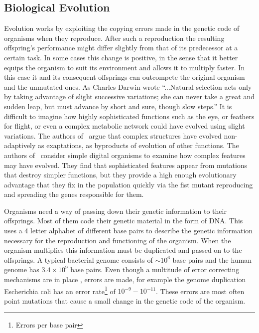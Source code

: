 \documentclass[a4paper,12pt]{article}
\begin{document}
	
	\subsection{Biological Evolution}\label{chap:evolution}
	
	Evolution works by exploiting the copying errors made in the genetic code of organisms when they reproduce. After such a reproduction the resulting offspring's performance might differ slightly from that of its predecessor at a certain task. In some cases this change is positive, in the sense that it better equips the organism to suit its environment and allows it to multiply faster. In this case it and its consequent offsprings can outcompete the original organism and the unmutated ones. As Charles Darwin wrote ``...Natural selection acts only by taking advantage of slight successive variations; she can never take a great and sudden leap, but must advance by short and sure, though slow steps.'' \cite{darwin} 
	It is difficult to imagine how highly sophisticated functions such as the eye, or feathers for flight, or even a complex metabolic network could have evolved using slight variations. The authors of~\cite{latent} argue that complex structures have evolved non-adaptively as exaptations, as byproducts of evolution of other functions. The authors of~\cite{complexfeatures} consider simple digital organisms to examine how complex features may have evolved. They find that sophisticated features appear from mutations that destroy simpler functions, but they provide a high enough evolutionary advantage that they fix in the population quickly via the fist mutant reproducing and spreading the genes responsible for them. 
	

	Organisms need a way of passing down their genetic information to their offsprings. 
	Most of them code their genetic material in the form of DNA. This uses a 4 letter alphabet of different base pairs to describe the genetic information necessary for the reproduction and functioning of the organism. When the organism multiplies this information must be duplicated and passed on to the offsprings. A typical bacterial genome consists of $\sim 10^6$ base pairs and the human genome has $3.4 \times 10^9$ base pairs. Even though a multitude of error correcting mechanisms are in place \cite{dnarepair}, errors are made, for example the genome duplication Escherichia coli has an error rate\footnote{Errors per base pair} of $10^{-9} - 10^{-11}$\cite{ecolierrorrate}. These errors are most often point mutations that cause a small change in the genetic code of the organism.
	
\end{document}
